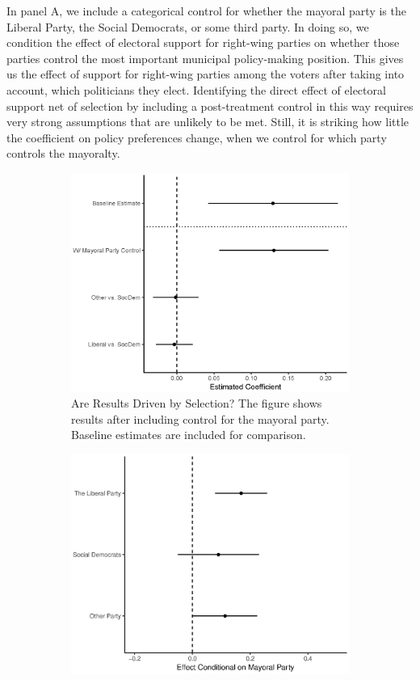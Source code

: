 \documentclass[a4paper,12pt]{article}
\begin{document}
In panel A, we include a categorical control for whether the mayoral party is the Liberal Party, the Social Democrats, or some third party.  In doing so, we condition the effect of electoral support for right-wing parties on whether those parties control the most important municipal policy-making position. This gives us the effect of support for right-wing parties among the voters after taking into account, which politicians they elect. Identifying the direct effect of electoral support net of selection by including a post-treatment control in this way requires very strong assumptions that are unlikely to be met. Still, it is striking how little the coefficient on policy preferences change, when we control for which party controls the mayoralty. 

\begin{figure}[!htb]
	\begin{subfigure}{0.45\textwidth}
		\includegraphics[width=1\textwidth]{PostTreatControl.eps}
		\caption{Are Results Driven by Selection? The figure shows results after including control for the mayoral party. Baseline estimates are included for comparison.} \label{mech}
	\end{subfigure}  \hfill
	\begin{subfigure}{0.45\textwidth}
		\includegraphics[width=1\textwidth]{MargFX_31082018.eps}

\end{subfigure}
\end{figure}
\end{document}
